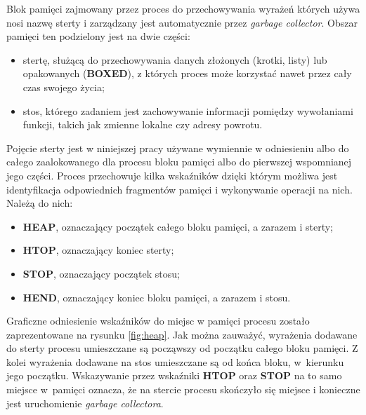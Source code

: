Blok pamięci zajmowany przez proces do przechowywania wyrażeń których używa nosi nazwę sterty i zarządzany jest automatycznie przez \emph{garbage collector}.
Obszar pamięci ten podzielony jest na dwie części:
\begin{itemize}
\item stertę, służącą do przechowywania danych złożonych (krotki, listy) lub opakowanych (\textbf{BOXED}), z których proces może korzystać nawet przez cały czas swojego życia;
\item stos, którego zadaniem jest zachowywanie informacji pomiędzy wywołaniami funkcji, takich jak zmienne lokalne czy adresy powrotu.
\end{itemize}

Pojęcie sterty jest w niniejszej pracy używane wymiennie w odniesieniu albo do całego zaalokowanego dla procesu bloku pamięci albo do pierwszej wspomnianej jego części.
Proces przechowuje kilka wskaźników dzięki którym możliwa jest identyfikacja odpowiednich fragmentów pamięci i wykonywanie operacji na nich. Należą do nich:
\begin{itemize}
\item \textbf{HEAP}, oznaczający początek całego bloku pamięci, a zarazem i sterty;
\item \textbf{HTOP}, oznaczający koniec sterty;
\item \textbf{STOP}, oznaczający początek stosu;
\item \textbf{HEND}, oznaczający koniec bloku pamięci, a zarazem i stosu.
\end{itemize}
Graficzne odniesienie wskaźników do miejsc w pamięci procesu zostało zaprezentowane na rysunku \ref{fig:heap}. 
Jak można zauważyć, wyrażenia dodawane do sterty procesu umieszczane są począwszy od początku całego bloku pamięci.
Z kolei wyrażenia dodawane na stos umieszczane są od końca bloku, w~kierunku jego początku.
Wskazywanie przez wskaźniki \textbf{HTOP} oraz \textbf{STOP} na to samo miejsce w~pamięci oznacza, że na stercie procesu skończyło się miejsce i konieczne jest uruchomienie \emph{garbage collectora}.

